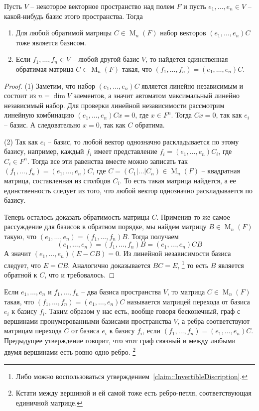 \begin{claim}
\label{claim::BasisClassification}
Пусть $V$ -- некоторое векторное пространство над полем $F$ и пусть $e_1,\ldots, e_n\in V$ -- какой-нибудь базис этого пространства.
Тогда
\begin{enumerate}
\item Для любой обратимой матрицы $C\in \operatorname{M}_{n}(F)$ набор векторов $(e_1,\ldots,e_n)C$ тоже является базисом.

\item Если $f_1,\ldots,f_n\in V$ -- любой другой базис $V$, то найдется единственная обратимая матрица $C\in\operatorname{M}_n(F)$ такая, что $(f_1,\ldots,f_n) = (e_1,\ldots,e_n)C$.
\end{enumerate}
\end{claim}
\begin{proof}
(1) Заметим, что набор $(e_1,\ldots,e_n)C$ является линейно независимым и состоит из $n = \dim V$ элементов, а значит автоматом максимальный линейно независимый набор.
Для проверки линейной независимости рассмотрим линейную комбинацию $(e_1,\ldots,e_n)Cx = 0$, где $x\in F^n$.
Тогда $Cx = 0$, так как $e_i$ -- базис.
А следовательно $x = 0$, так как $C$ обратима.

(2) Так как $e_i$ -- базис, то любой вектор однозначно раскладывается по этому базису, например, каждый $f_i$ имеет представление $f_i = (e_1,\ldots, e_n) C_i$, где $C_i\in F^n$.
Тогда все эти равенства вместе можно записать так $(f_1,\ldots,f_n) = (e_1,\ldots,e_n) C$, где $C = (C_1|\ldots|C_n)\in \operatorname{M}_n (F)$ -- квадратная матрица, составленная из столбцов $C_i$.
То есть такая матрица найдется, а ее единственность следует из того, что любой вектор однозначно раскладывается по базису.

Теперь осталось доказать обратимость матрицы $C$.
Применив то же самое рассуждение для базисов в обратном порядке, мы найдем матрицу $B\in \operatorname{M}_n(F)$ такую, что $(e_1,\ldots,e_n) = (f_1,\ldots,f_n) B$.
Тогда получаем 
\[
(e_1,\ldots,e_n) = (f_1,\ldots,f_n)B = (e_1,\ldots,e_n)CB
\]
А значит $(e_1,\ldots, e_n)(E - CB) = 0$.
Из линейной независимости базиса следует, что $E = CB$.
Аналогично доказывается $BC = E$,%
\footnote{Либо можно воспользоваться утверждением~\ref{claim::InvertibleDiscription}.}
то есть $B$ является обратной к $C$, что и требовалось.
\end{proof}


Если $e_1,\ldots,e_n$ и $f_1,\ldots,f_n$ -- два базиса пространства $V$, то матрица $C\in \operatorname{M}_n(F)$ такая, что $(f_1,\ldots, f_n) = (e_1,\ldots,e_n)C$ называется матрицей перехода от базиса $e_i$ к базису $f_i$.
Таким образом у нас есть, вообще говоря бесконечный, граф с вершинами пронумерованными базисами пространства $V$, а ребра соответствуют матрицам перехода $C$ от базиса $e_i$ к базису $f_i$, если $(f_1,\ldots,f_n) = (e_1,\ldots,e_n)C$.
Предыдущее утверждение говорит, что этот граф связный и между любыми двумя вершинами есть ровно одно ребро.%
\footnote{Кстати между вершиной и ей самой тоже есть ребро-петля, соответствующая единичной матрице.}

